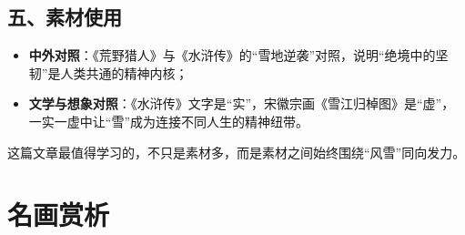 \begin{handoutlayout}
\begin{techbox}
\subsection*{五、素材使用}
\begin{itemize}[leftmargin=*]
    \item \textbf{中外对照}：《荒野猎人》与《水浒传》的“雪地逆袭”对照，说明“绝境中的坚韧”是人类共通的精神内核；
    \item \textbf{文学与想象对照}：《水浒传》文字是“实”，宋徽宗画《雪江归棹图》是“虚”，一实一虚中让“雪”成为连接不同人生的精神纽带。
\end{itemize}
\end{techbox}

\begin{keyquote}
这篇文章最值得学习的，不只是素材多，而是素材之间始终围绕“风雪”同向发力。
\end{keyquote}

\end{handoutlayout}


\section*{名画赏析}


